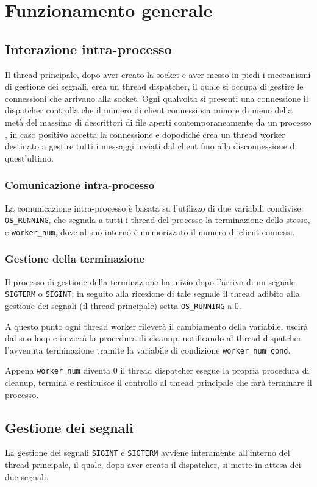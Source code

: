 \documentclass[a4paper,11pt]{article}
\begin{document}
\section{Funzionamento generale}
\subsection{Interazione intra-processo}
Il thread principale, dopo aver creato la socket e aver messo in piedi i meccanismi di gestione dei segnali, crea un thread dispatcher, il quale
si occupa di gestire le connessioni che arrivano alla socket. Ogni qualvolta si presenti una connessione il dispatcher controlla che il numero di client connessi
sia minore di meno della metà del massimo di descrittori di file aperti contemporaneamente da un processo , in caso positivo accetta la connessione e dopodiché crea un thread worker destinato a gestire tutti i messaggi inviati dal client fino
alla disconnessione di quest'ultimo.
\subsubsection{Comunicazione intra-processo}
La comunicazione intra-processo è basata su l'utilizzo di due variabili condivise: \texttt{OS\_RUNNING}, che segnala a tutti i thread del processo la terminazione
dello stesso, e \texttt{worker\_num}, dove al suo interno è memorizzato il numero di client connessi.
\subsubsection{Gestione della terminazione}
Il processo di gestione della terminazione ha inizio dopo l'arrivo di un segnale \texttt{SIGTERM} o \texttt{SIGINT}; in seguito alla ricezione di tale segnale
il thread adibito alla gestione dei segnali (il thread principale) setta \texttt{OS\_RUNNING} a 0.

A questo punto ogni thread worker rileverà il cambiamento della variabile, uscirà dal suo loop e inizierà la procedura di cleanup,
notificando al thread dispatcher l'avvenuta terminazione tramite la variabile di condizione \texttt{worker\_num\_cond}.

Appena \texttt{worker\_num} diventa 0 il thread dispatcher esegue la propria procedura di cleanup, termina e restituisce il controllo al thread principale che farà terminare il processo.
\subsection{Gestione dei segnali}
La gestione dei segnali \texttt{SIGINT} e \texttt{SIGTERM} avviene interamente all'interno del thread principale, il quale, dopo aver creato il dispatcher, si mette in attesa dei due segnali.
\end{document}
